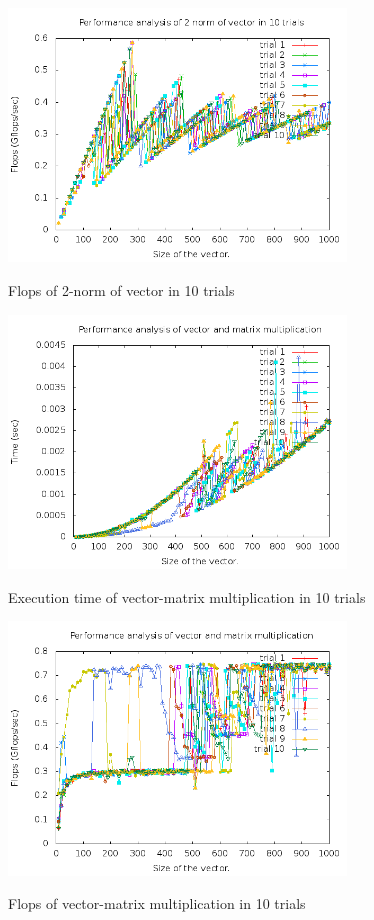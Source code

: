 \documentclass{article}
\begin{document}
    \begin{figure}[th!]
        \centering
        \includegraphics[width=0.8\textwidth]{flopsTwoNorm.png}
        \label{fig:flopsTwoNorm}
        \caption{Flops of 2-norm of vector in 10 trials}
    \end{figure}
    
    \begin{figure}[th!]
        \centering
        \includegraphics[width=0.8\textwidth]{timingVecMul.png}
        \label{fig:timeVecMul}
        \caption{Execution time of vector-matrix multiplication in 10 trials}
    \end{figure}
    \begin{figure}[th!]
        \centering
        \includegraphics[width=0.8\textwidth]{flopsVecMul.png}
        \label{fig:flopsVecMul}
        \caption{Flops of vector-matrix multiplication in 10 trials}
    \end{figure}
\end{document}
